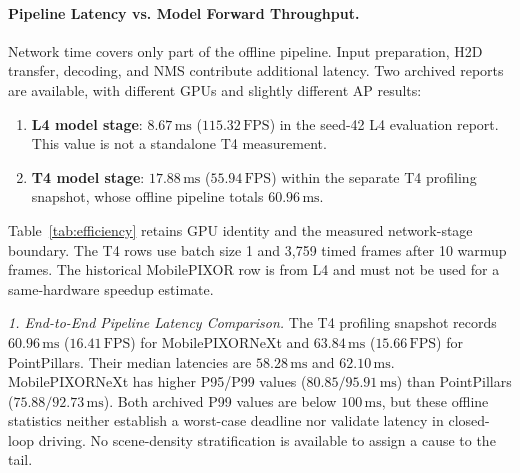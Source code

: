 \paragraph{Pipeline Latency vs. Model Forward Throughput.}
Network time covers only part of the offline pipeline. Input preparation, H2D transfer, decoding, and NMS contribute additional latency. Two archived reports are available, with different GPUs and slightly different AP results:
\begin{enumerate}
    \item \textbf{L4 model stage}: $8.67\,\text{ms}$ ($115.32\,\text{FPS}$) in the seed-42 L4 evaluation report. This value is not a standalone T4 measurement.
    \item \textbf{T4 model stage}: $17.88\,\text{ms}$ ($55.94\,\text{FPS}$) within the separate T4 profiling snapshot, whose offline pipeline totals $60.96\,\text{ms}$.
\end{enumerate}
Table~\ref{tab:efficiency} retains GPU identity and the measured network-stage boundary. The T4 rows use batch size 1 and 3,759 timed frames after 10 warmup frames. The historical MobilePIXOR row is from L4 and must not be used for a same-hardware speedup estimate.



\textit{1. End-to-End Pipeline Latency Comparison.}
The T4 profiling snapshot records $60.96\,\text{ms}$ ($16.41\,\text{FPS}$) for MobilePIXORNeXt and $63.84\,\text{ms}$ ($15.66\,\text{FPS}$) for PointPillars. Their median latencies are $58.28\,\text{ms}$ and $62.10\,\text{ms}$. MobilePIXORNeXt has higher P95/P99 values ($80.85/95.91\,\text{ms}$) than PointPillars ($75.88/92.73\,\text{ms}$). Both archived P99 values are below $100\,\text{ms}$, but these offline statistics neither establish a worst-case deadline nor validate latency in closed-loop driving. No scene-density stratification is available to assign a cause to the tail.

